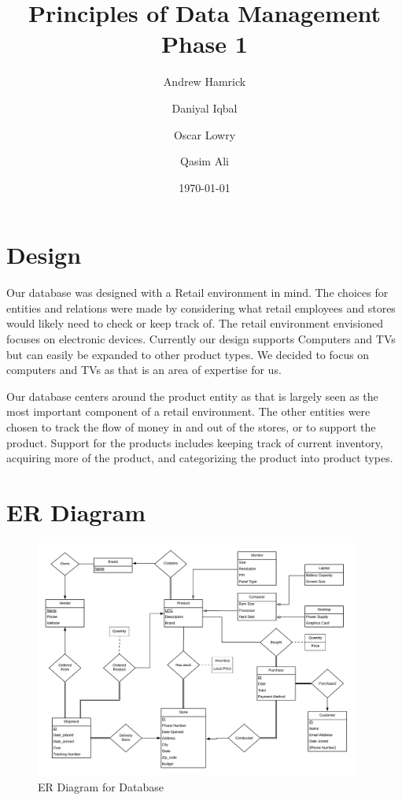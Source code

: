 \documentclass{article}
\title{Principles of Data Management\\\Large Phase 1}
\date{\today}
\author{
	Andrew Hamrick
	\and
	Daniyal Iqbal
	\and
	Oscar Lowry
	\and
	Qasim Ali
}
\begin{document}
	\maketitle
	\newpage

	\section{Design}
		Our database was designed with a Retail environment in mind. The choices for
		entities and relations were made by considering what retail employees and
		stores would likely need to check or keep track of. The retail environment
		envisioned focuses on electronic devices. Currently our design supports
		Computers and TVs but can easily be expanded to other product types. We
		decided to focus on computers and TVs as that is an area of expertise for
		us.\\
		\vspace{0pt}

		Our database centers around the product entity as that is largely seen as
		the most important component of a retail environment. The other entities
		were chosen to track the flow of money in and out of the stores, or to
		support the product. Support for the products includes keeping track of
		current inventory, acquiring more of the product, and categorizing the
		product into product types.

	\section{ER Diagram}
    \begin{figure}[H]
      \centering
      \includegraphics[width=0.95\textwidth]{ER_diagram}
      \caption{ER Diagram for Database}
      \label{fig:er}
    \end{figure}
\end{document}
